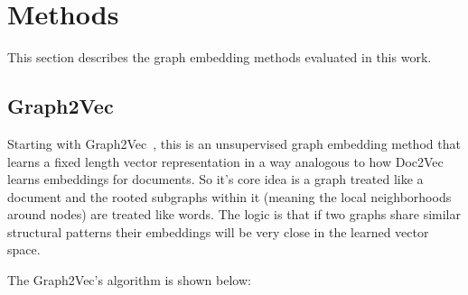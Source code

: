 \section{Methods}




This section describes the graph embedding methods evaluated in this work.%
\subsection{Graph2Vec}
Starting with Graph2Vec~\cite{narayanangraph2vec}, this is an unsupervised graph embedding method that learns 
a fixed length vector representation in a way analogous to how Doc2Vec learns embeddings for documents.
So it's core idea is a graph treated like a document and the rooted subgraphs within it (meaning the local neighborhoods around nodes) 
are treated like words. The logic is that if two graphs share similar structural patterns their embeddings 
will be very close in the learned vector space.


The Graph2Vec's algorithm is shown below:

